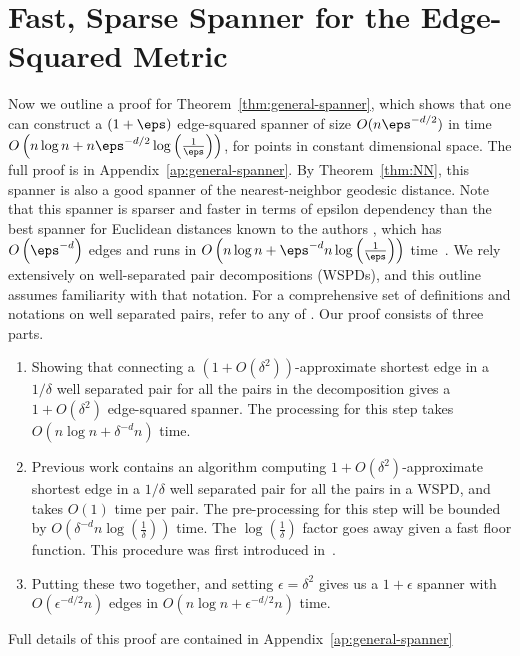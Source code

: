\section{Fast, Sparse Spanner for the Edge-Squared
Metric}
\label{sec:general-spanner}

Now we outline a proof for Theorem~\ref{thm:general-spanner}, which shows that one can
construct a $(1+\eps)$ edge-squared spanner of size $O(n \eps^{-d/2})$ in
time $O\left(n \log n + n \eps^{-d/2} \log \left(\frac{1}{\eps}\right)\right)$, 
for points in constant dimensional space. The full proof is in
Appendix~\ref{ap:general-spanner}. By Theorem~\ref{thm:NN}, this
spanner is also a good spanner of the nearest-neighbor geodesic distance.
Note that this spanner is sparser and faster in terms of epsilon dependency than the best spanner for
Euclidean distances known to the authors
, which has $O\left(\eps^{-d}\right)$ edges and runs in
$O\left(n \log n +
\eps^{-d}n\log\left(\frac{1}{\eps}\right)\right)$
time~\cite{Callahan1993}. We rely extensively on well-separated pair decompositions
(WSPDs),
and this outline assumes familiarity with that notation.
For a comprehensive set of definitions and notations on well separated
pairs, refer to any of \cite{Callahan1995, Arya2016, Callahan1993,
arya95euclid}.  
Our proof consists of three parts.
\begin{enumerate}
\item Showing that connecting a $(1+O(\delta^2))$-approximate shortest edge
in a $1/\delta$ well separated pair for all the pairs in the decomposition
gives a $1+O(\delta^2)$ edge-squared spanner.
The processing for this step takes $O(n \log n + \delta^{-d}n)$ time.
\item Previous work contains an algorithm computing
  $1+O(\delta^2)$-approximate shortest edge in a $1/\delta$ well
    separated pair for all the pairs in a WSPD, and takes
    $O(1)$ time per pair. The pre-processing for this step will be
    bounded by $O(\delta^{-d}n\log\left(\frac{1}{\delta}\right))$ time. The $\log\left(\frac{1}{\delta}\right)$ factor goes away given a fast floor function. 
    This procedure was first introduced in~\cite{Callahan1995}.

\item Putting these two together, and setting $\epsilon = \delta^2$
gives us a $1+\epsilon$ spanner with
$O(\epsilon^{-d/2}n)$ edges in
    $O(n \log n + \epsilon^{-d/2}n)$ time.
\end{enumerate}
Full details of this proof are contained in Appendix~\ref{ap:general-spanner}

